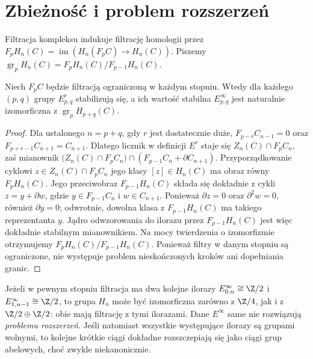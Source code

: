 \section{Zbieżność i problem rozszerzeń}
\begin{definicja}
Filtracja kompleksu indukuje filtrację homologii przez
$F_pH_n(C)=\operatorname{im}(H_n(F_pC)\to H_n(C))$.
Piszemy $\operatorname{gr}_pH_n(C)=F_pH_n(C)/F_{p-1}H_n(C)$.
\end{definicja}
\begin{twierdzenie}
\label{thm:convergence-v5}
Niech $F_pC$ będzie filtracją ograniczoną w każdym stopniu.
Wtedy dla każdego $(p,q)$ grupy $E^r_{p,q}$ stabilizują się,
a ich wartość stabilna $E^\infty_{p,q}$ jest naturalnie
izomorficzna z $\operatorname{gr}_pH_{p+q}(C)$.
\end{twierdzenie}
\begin{proof}
Dla ustalonego $n=p+q$, gdy $r$ jest dostatecznie duże,
$F_{p-r}C_{n-1}=0$ oraz $F_{p+r-1}C_{n+1}=C_{n+1}$.
Dlatego licznik w definicji $E^r$ staje się
$Z_n(C)\cap F_pC_n$, zaś mianownik
$\bigl(Z_n(C)\cap F_pC_n\bigr)\cap
(F_{p-1}C_n+\partial C_{n+1})$.
Przyporządkowanie cyklowi $z\in Z_n(C)\cap F_pC_n$
jego klasy $[z]\in H_n(C)$ ma obraz równy $F_pH_n(C)$.
Jego przeciwobraz $F_{p-1}H_n(C)$ składa się dokładnie
z cykli $z=y+\partial w$, gdzie
$y\in F_{p-1}C_n$ i $w\in C_{n+1}$.
Ponieważ $\partial z=0$ oraz $\partial^2w=0$,
również $\partial y=0$; odwrotnie, dowolna klasa z
$F_{p-1}H_n(C)$ ma takiego reprezentanta $y$.
Jądro odwzorowania do ilorazu przez $F_{p-1}H_n(C)$
jest więc dokładnie stabilnym mianownikiem.
Na mocy twierdzenia o izomorfizmie otrzymujemy
$F_pH_n(C)/F_{p-1}H_n(C)$. Ponieważ filtry w danym
stopniu są ograniczone, nie występuje problem nieskończonych
kroków ani dopełniania granic.
\end{proof}
\begin{przyklad}
Jeżeli w pewnym stopniu filtracja ma dwa kolejne ilorazy
$E^\infty_{0,n}\cong\Z/2$ i
$E^\infty_{1,n-1}\cong\Z/2$, to grupa $H_n$ może być
izomorficzna zarówno z $\Z/4$, jak i z
$\Z/2\oplus\Z/2$: obie mają filtrację z tymi ilorazami.
Dane $E^\infty$ same nie rozwiązują \emph{problemu rozszerzeń}.
Jeśli natomiast wszystkie występujące ilorazy są grupami wolnymi,
to kolejne krótkie ciągi dokładne rozszczepiają się jako ciągi
grup abelowych, choć zwykle niekanonicznie.
\end{przyklad}
